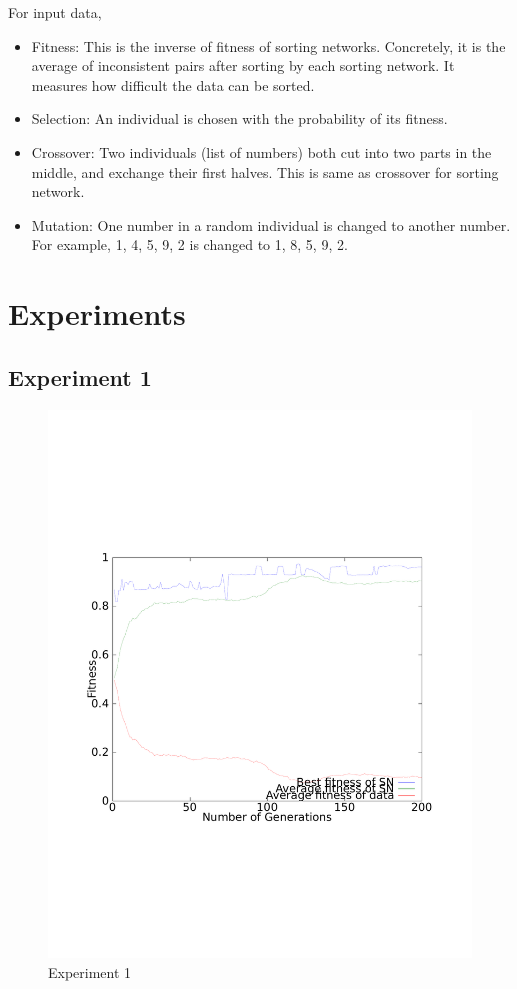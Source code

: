 \documentclass[11pt]{article}
\begin{document}
For input data,

\begin{itemize}
\item Fitness: This is the inverse of fitness of sorting networks.
Concretely, it is the average of inconsistent pairs after sorting by
each sorting network. It measures how difficult the data can
be sorted.

\item Selection: An individual is chosen with the probability of its
fitness.

\item Crossover: Two individuals (list of numbers) both cut into two
parts in the middle, and exchange their first halves. This is same as
crossover for sorting network.

\item Mutation: One number in a random individual is changed to
another number. For example, 1, 4, 5, 9, 2 is changed to 1, 8, 5, 9,
2.
\end{itemize}

\section{Experiments}

\subsection{Experiment 1}

\begin{figure}[h!]
\centering
\includegraphics[width=\textwidth]{1.pdf}
\caption{Experiment 1}
\label{fig:lin_opt}
\end{figure}
\end{document}
